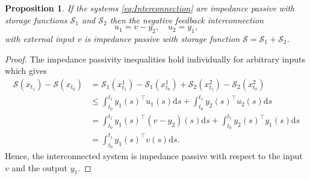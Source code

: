 \documentclass[10pt,a4paper]{amsart}
\newtheorem{proposition}{Proposition}
\begin{document}
\begin{proposition}
If the systems \eqref{eq:Interconnection} are impedance passive  with storage functions $\mathcal{S}_1$ and $\mathcal{S}_2$ then the negative feedback interconnection
\[
u_1=v-y_2, \quad u_2=y_1,
\]
with external input $v$ is impedance passive with storage function $\mathcal{S}=\mathcal{S}_1+\mathcal{S}_2$.  
\end{proposition}

\begin{proof}
The impedance passivity inequalities hold individually for arbitrary inputs which gives
\begin{align*}
\mathcal{S}(x_{t_1})-\mathcal{S}(x_{t_0})&=\mathcal{S}_1(x_{t_1}^1)-\mathcal{S}_1(x_{t_0}^1)+\mathcal{S}_2(x_{t_1}^2)-\mathcal{S}_2(x_{t_0}^2) \\ 
&\leq \int_{t_0}^{t_1}y_1(s)^\top u_1(s)\mathrm{d}s+\int_{t_0}^{t_1}y_2(s)^\top u_2(s)\mathrm{d}s\\
&=\int_{t_0}^{t_1}y_1(s)^\top (v-y_2)(s)\mathrm{d}s+\int_{t_0}^{t_1}y_2(s)^\top y_1(s)\mathrm{d}s\\
&=\int_{t_0}^{t_1}y_1(s)^\top v(s)\mathrm{d}s.
\end{align*}
Hence, the interconnected system is impedance passive with respect to the input $v$ and the output $y_1$.
\end{proof}
\end{document}
